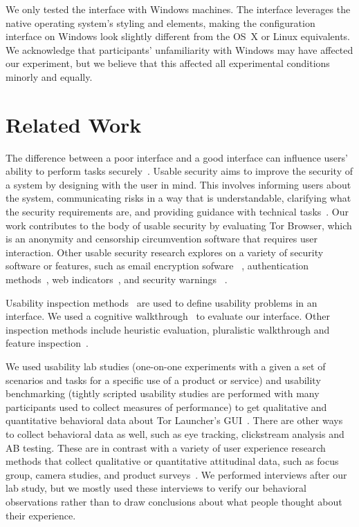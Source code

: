 \documentclass[USenglish,oneside,twocolumn]{article}
\begin{document}
We only tested the interface with Windows machines.
The interface leverages the native operating system's styling and elements, making the configuration interface on Windows look slightly different from the OS~X or Linux equivalents. We acknowledge that participants' unfamiliarity with Windows may have affected our experiment, but we believe that this affected all experimental conditions minorly and equally.  

\section{Related Work}
\label{sec:related} 
The difference between a poor interface and a good interface can influence users’ ability to perform tasks securely~\cite{payne2008brief}. Usable security aims to improve the security of a system by designing with the user in mind. This involves informing users about the system, communicating risks in a way that is understandable, clarifying what the security requirements are, and providing guidance with technical tasks~\cite{adams1999users}. Our work contributes to the body of usable security by evaluating Tor Browser, which is an anonymity and censorship circumvention software that requires user interaction. Other usable security research explores on a variety of security software or features, such as email encryption sofware ~\cite{whitten1999johnny}\cite{garfinkel2005johnny}, authentication methods~\cite{morris1979password}\cite{dhamija2000deja}\cite{suo2005graphical}, web indicators~\cite{dhamija2006phishing}\cite{akhawe2013alice}, and security warnings ~\cite{schechter2007emperor}\cite{egelman2008you}. 

Usability inspection methods~\cite{nielsen1994usability} are used to define usability problems in an interface. We
used a cognitive walkthrough~\cite{wharton1994cognitive}\cite{cognitive-walkthrough} to evaluate our interface. Other inspection methods include heuristic evaluation, pluralistic walkthrough and feature inspection~\cite{inspection}.  

We used usability lab studies (one-on-one experiments with a given a set of scenarios and tasks for a specific use of  a product or service) and usability benchmarking (tightly scripted usability studies are performed with many participants used to collect measures of performance) to get qualitative and quantitative behavioral data about Tor Launcher's GUI~\cite{krol2016towards}. There are other ways to collect behavioral data as well, such as eye tracking, clickstream analysis and AB testing. These are in contrast with a variety of user experience research methods that collect qualitative or quantitative attitudinal data, such as focus group, camera studies, and product surveys~\cite{ux-methods}. We performed interviews after our lab study, but we mostly used these interviews to verify our behavioral observations rather than to draw conclusions about what people thought about their experience. 
 
\end{document}
